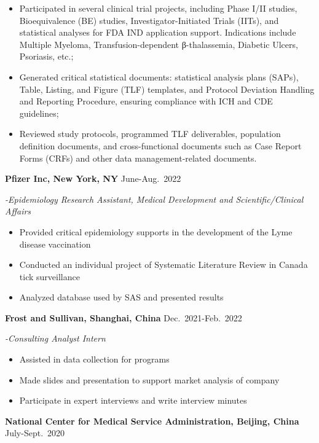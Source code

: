 \documentclass[
  a4paper,
]{article}
\providecommand{\tightlist}{%
  \setlength{\itemsep}{0pt}\setlength{\parskip}{0pt}}
\begin{document}
\begin{itemize}
\tightlist
\item
  Participated in several clinical trial projects, including Phase I/II
  studies, Bioequivalence (BE) studies, Investigator-Initiated Trials
  (IITs), and statistical analyses for FDA IND application support.
  Indications include Multiple Myeloma, Transfusion-dependent
  β-thalassemia, Diabetic Ulcers, Psoriasis, etc.;
\item
  Generated critical statistical documents: statistical analysis plans
  (SAPs), Table, Listing, and Figure (TLF) templates, and Protocol
  Deviation Handling and Reporting Procedure, ensuring compliance with
  ICH and CDE guidelines;
\item
  Reviewed study protocols, programmed TLF deliverables, population
  definition documents, and cross-functional documents such as Case
  Report Forms (CRFs) and other data management-related documents.
\end{itemize}

\newpage

\textbf{Pfizer Inc, New York, NY} \hfill  June-Aug.~2022

\emph{\emph{-Epidemiology Research Assistant, Medical Development and
Scientific/Clinical Affairs}}

\begin{itemize}
\tightlist
\item
  Provided critical epidemiology supports in the development of the Lyme
  disease vaccination
\item
  Conducted an individual project of Systematic Literature Review in
  Canada tick surveillance
\item
  Analyzed database used by SAS and presented results
\end{itemize}

\textbf{Frost and Sullivan, Shanghai, China} \hfill  Dec.~2021-Feb.~2022

\emph{\emph{-Consulting Analyst Intern}}

\begin{itemize}
\tightlist
\item
  Assisted in data collection for programs
\item
  Made slides and presentation to support market analysis of company
\item
  Participate in expert interviews and write interview minutes
\end{itemize}

\textbf{National Center for Medical Service Administration, Beijing,
China} \hfill  July-Sept.~2020
\end{document}

